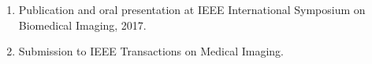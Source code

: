 \listofpublications


\noindent
\begin{enumerate}
    \item Publication and oral presentation at IEEE International Symposium on Biomedical Imaging, 2017.
    \item Submission to IEEE Transactions on Medical Imaging.
\end{enumerate} 









